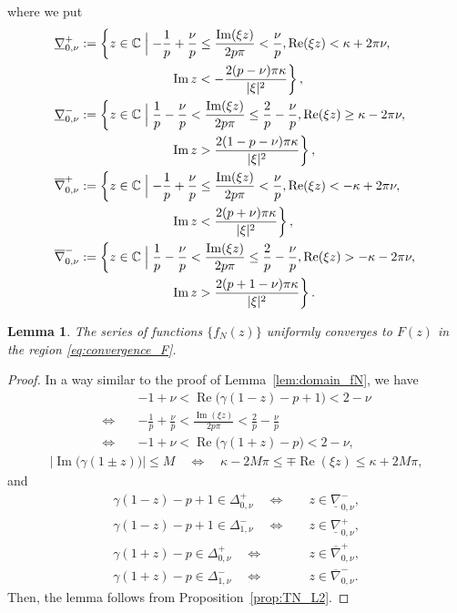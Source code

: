 \documentclass[a4paper,dvipdfmx]{amsart}
\theoremstyle{plain}
\newtheorem{lem}[thm]{Lemma}
\theoremstyle{definition}
\theoremstyle{remark}
\newcommand{\C}{\mathbb{C}}
\renewcommand{\Re}{\operatorname{Re}}
\renewcommand{\Im}{\operatorname{Im}}
\numberwithin{equation}{section}
\begin{document}
where we put
\begin{align*}
  \underline{\nabla}_{0,\nu}^{+}
  &:=
  \left\{
    z\in\C\Bigm|
    -\frac{1}{p}+\frac{\nu}{p}\le\frac{\Im(\xi z)}{2p\pi}<\frac{\nu}{p},
    \Re(\xi z)<\kappa+2\pi\nu,
  \right.
  \\
  &\qquad\qquad\phantom{z\in\C\Bigm|}
  \left.
    \Im{z}<-\frac{2(p-\nu)\pi\kappa}{|\xi|^2}
  \right\},
  \\
  \underline{\nabla}_{0,\nu}^{-}
  &:=
  \left\{
    z\in\C\Bigm|
    \frac{1}{p}-\frac{\nu}{p}<\frac{\Im(\xi z)}{2p\pi}\le\frac{2}{p}-\frac{\nu}{p},
    \Re(\xi z)\ge\kappa-2\pi\nu,
  \right.
  \\
  &\qquad\qquad\phantom{z\in\C\Bigm|}
  \left.
    \Im{z}>\frac{2(1-p-\nu)\pi\kappa}{|\xi|^2}
  \right\},
  \\
  \overline{\nabla}_{0,\nu}^{+}
  &:=
  \left\{
    z\in\C\Bigm|
    -\frac{1}{p}+\frac{\nu}{p}\le\frac{\Im(\xi z)}{2p\pi}<\frac{\nu}{p},
    \Re(\xi z)<-\kappa+2\pi\nu,
  \right.
  \\
  &\qquad\qquad\phantom{z\in\C\Bigm|}
  \left.
    \Im{z}<\frac{2(p+\nu)\pi\kappa}{|\xi|^2}
  \right\},
  \\
  \overline{\nabla}_{0,\nu}^{-}
  &:=
  \left\{
    z\in\C\Bigm|
    \frac{1}{p}-\frac{\nu}{p}<\frac{\Im(\xi z)}{2p\pi}\le\frac{2}{p}-\frac{\nu}{p},
    \Re(\xi z)>-\kappa-2\pi\nu,
  \right.
  \\
  &\qquad\qquad\phantom{z\in\C\Bigm|}
  \left.
    \Im{z}>\frac{2(p+1-\nu)\pi\kappa}{|\xi|^2}
  \right\}.
\end{align*}
\begin{lem}\label{lem:convergence_fN}
The series of functions $\{f_N(z)\}$ uniformly converges to $F(z)$ in the region \eqref{eq:convergence_F}.
\end{lem}
\begin{proof}
In a way similar to the proof of Lemma~\ref{lem:domain_fN}, we have
\begin{align*}
  &-1+\nu<\Re\bigl(\gamma(1-z)-p+1\bigr)<2-\nu
  \\
  \Leftrightarrow\quad&
  -\frac{1}{p}+\frac{\nu}{p}<\frac{\Im(\xi z)}{2p\pi}<\frac{2}{p}-\frac{\nu}{p}
  \\
  \Leftrightarrow\quad&
  -1+\nu<\Re\bigl(\gamma(1+z)-p\bigr)<2-\nu,
\end{align*}
\begin{align*}
  \left|\Im\bigl(\gamma(1\pm z)\bigr)\right|\le M
  \quad\Leftrightarrow\quad
  \kappa-2M\pi\le\mp\Re(\xi z)\le\kappa+2M\pi,
\end{align*}
and
\begin{align*}
  \gamma(1-z)-p+1\in\Delta^{+}_{0,\nu}
  \quad\Leftrightarrow\quad&
  z\in\underline{\nabla}_{0,\nu}^{-},
  \\
  \gamma(1-z)-p+1\in\Delta^{-}_{1,\nu}
  \quad\Leftrightarrow\quad&
  z\in\underline{\nabla}_{0,\nu}^{+},
  \\
  \gamma(1+z)-p\in\Delta^{+}_{0,\nu}
  \quad\Leftrightarrow\quad&
  z\in\overline{\nabla}_{0,\nu}^{+},
  \\
  \gamma(1+z)-p\in\Delta^{-}_{1,\nu}
  \quad\Leftrightarrow\quad&
  z\in\overline{\nabla}_{0,\nu}^{-}.
\end{align*}
Then, the lemma follows from Proposition~\ref{prop:TN_L2}.
\end{proof}
\end{document}
